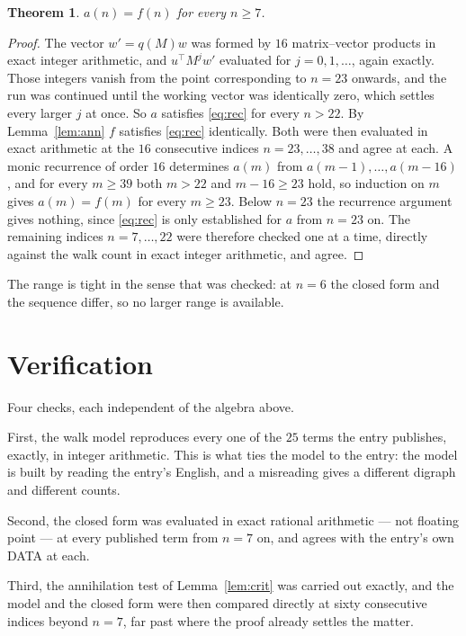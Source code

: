 \documentclass[11pt,a4paper]{article}
\theoremstyle{plain}
\newtheorem{theorem}{Theorem}
\theoremstyle{definition}
\begin{document}
\begin{theorem}
$a(n)=f(n)$ for every $n\ge7$.
\end{theorem}

\begin{proof}
The vector $w'=q(M)w$ was formed by $16$ matrix--vector products in exact integer
arithmetic, and $u^{\!\top}M^{j}w'$ evaluated for $j=0,1,\dots$, again exactly. Those integers
vanish from the point corresponding to $n=23$ onwards, and the run was continued until the
working vector was identically zero, which settles every larger $j$ at once. So $a$ satisfies
\eqref{eq:rec} for every $n>22$. By Lemma~\ref{lem:ann} $f$ satisfies \eqref{eq:rec}
identically. Both were then evaluated in exact arithmetic at the $16$ consecutive indices
$n=23,\dots,38$ and agree at each. A monic recurrence of order $16$
determines $a(m)$ from $a(m-1),\dots,a(m-16)$, and for every $m\ge39$ both
$m>22$ and $m-16\ge23$ hold, so induction on $m$ gives $a(m)=f(m)$ for every
$m\ge23$.
Below $n=23$ the recurrence argument gives nothing, since \eqref{eq:rec} is only
established for $a$ from $n=23$ on. The remaining indices $n=7,\dots,22$ were
therefore checked one at a time, directly against the walk count in exact integer arithmetic,
and agree.
\end{proof}

The range is tight in the sense that was checked: at $n=6$ the closed form and the sequence differ, so no larger range is available.

\section{Verification}

Four checks, each independent of the algebra above.

First, the walk model reproduces every one of the $25$ terms the entry publishes,
exactly, in integer arithmetic. This is what ties the model to the entry: the model is built
by reading the entry's English, and a misreading gives a different digraph and different
counts.

Second, the closed form was evaluated in exact rational arithmetic --- not floating point ---
at every published term from $n=7$ on, and agrees with the entry's own DATA at each.

Third, the annihilation test of Lemma~\ref{lem:crit} was carried out exactly, and the model
and the closed form were then compared directly at sixty consecutive indices beyond
$n=7$, far past where the proof already settles the matter.
\end{document}
